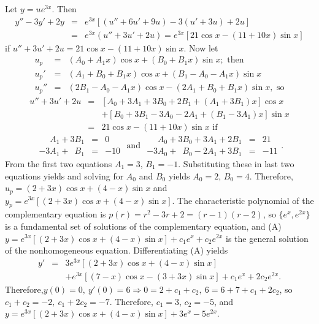 \documentclass[dvips]{book}
\renewcommand{\exer}[1]{\par\medskip\;\noindent{\color{red}\bf #1.}}
\numberwithin{example}{section}
\numberwithin{equation}{section}
\numberwithin{theorem}{section}
\numberwithin{table}{section}
\numberwithin{figure}{section}
\begin{document}
\exer{5.5.26}
Let $y=ue^{3x}$. Then
\begin{eqnarray*}
y''-3y'+2y&=&e^{3x}\left[(u''+6u'+9u)-3(u'+3u)+2u\right]\\
&=&e^{3x}(u''+3u'+2u)=
e^{3x}\left[21\cos x-(11+10x)\sin x\right]
\end{eqnarray*}
if $u''+3u'+2u=21\cos x-(11+10x)\sin x$.
Now let
\begin{eqnarray*}
u_p&=&(A_0+A_1x)\cos x+(B_0+B_1x)\sin x; \mbox{ then}\\
u_p'&=&(A_1+B_0+B_1x)\cos x+(B_1-A_0-A_1x)\sin x\\
u_p''&=&(2B_1-A_0-A_1x)\cos x-(2A_1+B_0+B_1x)\sin x, \mbox{ so}
\end{eqnarray*}
\begin{eqnarray*}
u''+3u'+2u&=&\left[A_0+3A_1+3B_0+2B_1+(A_1+3B_1)x\right]\cos x\\
&&+\left[B_0+3 B_1-3A_0-2A_1+(B_1-3A_1)x\right]\sin x \\
&=&21\cos x-(11+10x)\sin x \mbox{ if}
\end{eqnarray*}
$$
\begin{array}{rcr}
\phantom{-3}A_1+3B_1&=&0\\ -3A_1+\phantom{3}B_1&=&-10
\end{array}
\mbox{\  and \ }
\begin{array}{rcr}
\phantom{-3} A_0+3B_0+3A_1+2B_1&=&21\\
-3A_0+\phantom{3}B_0-2A_1+3B_1&=&-11
\end{array}.
$$
From the first two equations $A_1=3$, $B_1=-1$. Substituting these in
last two equations yields and solving for $A_0$ and $B_0$ yields
$A_0=2$, $B_0=4$. Therefore,
$u_p=(2+3x)\cos x+(4-x)\sin x$ and
$y_p=e^{3x}\left[(2+3x)\cos x+(4-x)\sin x\right]$.
The characteristic polynomial of the complementary equation is
$p(r)=r^2-3r+2=(r-1)(r-2)$, so $\{e^x,e^{2x}\}$ is a fundamental
set of solutions of the complementary equation, and
(A) $y=e^{3x}\left[(2+3x)\cos x+(4-x)\sin x\right]+c_1e^x+c_2e^{2x}$
is the general solution of the nonhomogeneous
equation. Differentiating (A) yields
\begin{eqnarray*}
y'&=&3e^{3x}\left[(2+3x)\cos x+(4-x)\sin x\right]\\ &&+
e^{3x}\left[(7-x)\cos x-(3+3x)\sin x\right]+c_1e^x+2c_2e^{2x}.
\end{eqnarray*}
 Therefore,$y(0)=0,\ y'(0)=6\Rightarrow 0=2+c_1+c_2,\
6=6+7+c_1+2c_2$, so $c_1+c_2=-2,\ c_1+2c_2=-7$.  Therefore,
$c_1=3$, $c_2=-5$, and
 $y=e^{3x}\left[(2+3x)\cos x+(4-x)\sin x\right]+3e^x-5e^{2x}$.
\end{document}
